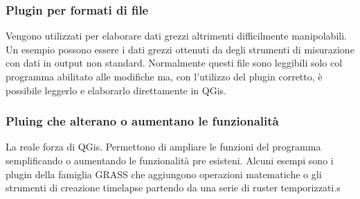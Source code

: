 \subsubsection{Plugin per formati di file}
Vengono utilizzati per elaborare dati grezzi altrimenti difficilmente manipolabili.
Un esempio possono essere i dati grezzi ottenuti da degli strumenti di misurazione con dati in output non standard.
Normalmente questi file sono leggibili solo col programma abilitato alle modifiche ma, con l'utilizzo del plugin corretto, è possibile leggerlo e elaborarlo direttamente in QGis.

\subsubsection{Pluing che alterano o aumentano le funzionalità}
La reale forza di QGis. Permettono di ampliare le funzioni del programma semplificando o aumentando le funzionalità pre esisteni. Alcuni esempi sono i plugin della famiglia GRASS che aggiungono operazioni matematiche o gli strumenti di creazione timelapse partendo da una serie di ruster temporizzati.s
